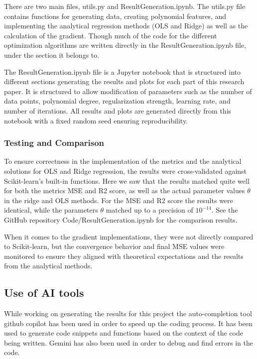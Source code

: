 \documentclass[twocolumn,aps]{revtex4}
\begin{document}
There are two main files, utils.py and ResultGeneration.ipynb.
The utils.py file contains functions for generating data, creating polynomial features, and implementing the analytical regression methods (OLS and Ridge) as well as the calculation of the gradient.
Though much of the code for the different optimization algorithms are written directly in the ResultGeneration.ipynb file, under the section it belongs to.

The ResultGeneration.ipynb file is a Jupyter notebook that is structured into different sections generating the results and plots for each part of this research paper.
It is structured to allow modification of parameters such as the number of data points, polynomial degree, regularization strength, learning rate, and number of iterations. All results and plots are generated directly from this notebook with a fixed random seed ensuring reproducibility.



\subsubsection{Testing and Comparison}
To ensure correctness in the implementation of the metrics and the analytical solutions for OLS and Ridge regression, the results were cross-validated against Scikit-learn's built-in functions.
Here we saw that the results matched quite well for both the metrics MSE and R2 score, as well as the actual parameter values $\theta$ in the ridge and OLS methods.
For the MSE and R2 score the results were identical, while the parameters $\theta$ matched up to a precision of $10^{-14}$.
See the GitHub repository \cite{rep} Code/ResultGeneration.ipynb for the comparison results.

When it comes to the gradient implementations, they were not directly compared to Scikit-learn, but the convergence behavior and final MSE values were monitored to ensure they aligned with theoretical expectations and the results from the analytical methods.

\subsection{Use of AI tools}
While working on generating the results for this project the auto-completion tool github copilot has been used in order to speed up the coding process.
It has been used to generate code snippets and functions based on the context of the code being written.
Gemini has also been used in order to debug and find errors in the code.
\end{document}
